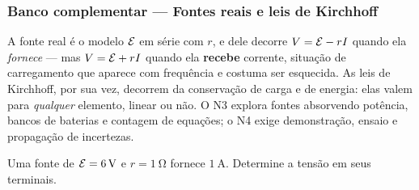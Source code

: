 
\subsubsection*{Banco complementar --- Fontes reais e leis de Kirchhoff}

\begin{atencao}
A fonte real é o modelo $\mathcal{E}$ em série com $r$, e dele decorre
$V=\mathcal{E}-rI$ quando ela \emph{fornece} --- mas $V=\mathcal{E}+rI$ quando ela
\textbf{recebe} corrente, situação de carregamento que aparece com frequência e
costuma ser esquecida. As leis de Kirchhoff, por sua vez, decorrem da
conservação de carga e de energia: elas valem para \emph{qualquer} elemento,
linear ou não. O N3 explora fontes absorvendo potência, bancos de baterias e
contagem de equações; o N4 exige demonstração, ensaio e propagação de
incertezas.
\end{atencao}

\blocofixacao

\begin{questao}[1]{}
Uma fonte de $\mathcal{E}=\SI{6}{\volt}$ e $r=\SI{1}{\ohm}$ fornece
$\SI{1}{\ampere}$. Determine a tensão em seus terminais.
\end{questao}

